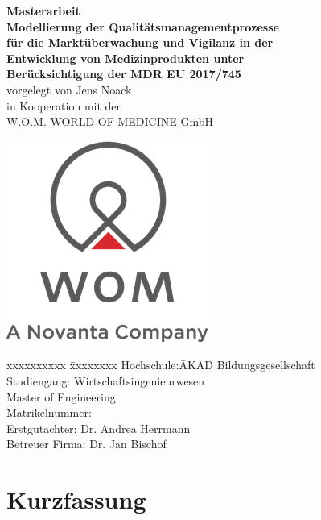 \documentclass[12pt,a4paper]{report}
\begin{document}
\begin{titlepage}
\centering
\vfill
{\bfseries\Huge Masterarbeit}\\[2cm]
{\bfseries\Large Modellierung der Qualitätsmanagementprozesse}\\[0.2cm]
{\bfseries\Large für die Marktüberwachung und Vigilanz in der}\\[0.2cm]
{\bfseries\Large Entwicklung von Medizinprodukten unter}\\[0.2cm]
{\bfseries\Large Berücksichtigung der MDR EU 2017/745}\\
\vfill
vorgelegt von
\vfill
{\large Jens Noack}\\
\vfill
in Kooperation mit der\\[0.5cm]
{\large W.O.M. WORLD OF MEDICINE GmbH}\\[1cm]
\begin{center}
\includegraphics[scale  = 0.5]{Images/wom_logo}
\end{center}
\vfill
\begin{center}\parbox{0cm}{\begin{tabbing}
xxxxxxxxxx \= xxxxxxxx \kill
Hochschule:\quad\quad\quad\quad\quad\quad\quad\quad\quad \= AKAD Bildungsgesellschaft \\
Studiengang: \> Wirtschaftsingenieurwesen \\
\> Master of Engineering \\
Matrikelnummer:  \\
Erstgutachter: \> Dr. Andrea Herrmann\\
Betreuer Firma: \> Dr. Jan Bischof
\end{tabbing}}
\end{center}
\end{titlepage}

\chapter*{Kurzfassung} %
\end{document}
